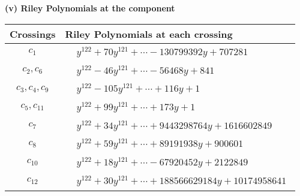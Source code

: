 \documentclass[1p]{elsarticle_modified}
\theoremstyle{definition}
\begin{document}
\newpage\renewcommand{\arraystretch}{1}
\flushleft \textbf{(v) Riley Polynomials at the component}\newline \\
\begin{tabular}{m{50pt}|m{274pt}}
Crossings & \hspace{64pt}Riley Polynomials at each crossing \\
\hline $$\begin{aligned}c_{1}\end{aligned}$$&$\begin{aligned}
&y^{122}+70 y^{121}+\cdots-130799392 y+707281
\end{aligned}$\\
\hline $$\begin{aligned}c_{2},c_{6}\end{aligned}$$&$\begin{aligned}
&y^{122}-46 y^{121}+\cdots-56468 y+841
\end{aligned}$\\
\hline $$\begin{aligned}c_{3},c_{4},c_{9}\end{aligned}$$&$\begin{aligned}
&y^{122}-105 y^{121}+\cdots+116 y+1
\end{aligned}$\\
\hline $$\begin{aligned}c_{5},c_{11}\end{aligned}$$&$\begin{aligned}
&y^{122}+99 y^{121}+\cdots+173 y+1
\end{aligned}$\\
\hline $$\begin{aligned}c_{7}\end{aligned}$$&$\begin{aligned}
&y^{122}+34 y^{121}+\cdots+9443298764 y+1616602849
\end{aligned}$\\
\hline $$\begin{aligned}c_{8}\end{aligned}$$&$\begin{aligned}
&y^{122}+59 y^{121}+\cdots+89191938 y+900601
\end{aligned}$\\
\hline $$\begin{aligned}c_{10}\end{aligned}$$&$\begin{aligned}
&y^{122}+18 y^{121}+\cdots-67920452 y+2122849
\end{aligned}$\\
\hline $$\begin{aligned}c_{12}\end{aligned}$$&$\begin{aligned}
&y^{122}+30 y^{121}+\cdots+188566629184 y+10174958641
\end{aligned}$\\
\hline
\end{tabular}\\~\\
\end{document}
